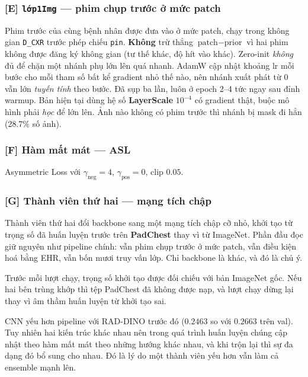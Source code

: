 \documentclass[11pt,a4paper]{article}
\newcommand{\code}[1]{\texttt{\small #1}}
\begin{document}
\subsubsection*{[E] \code{lớp1Img} --- phim chụp trước ở mức patch}

Phim trước của cùng bệnh nhân được đưa vào ở mức patch, chạy trong không gian
\code{D\_CXR} trước phép chiếu \code{pin}. \textbf{Không} trừ thẳng
$\text{patch} - \text{prior}$ vì hai phim không được đăng ký không gian (tư thế khác,
độ hít vào khác).
Zero-init \emph{không} đủ để chặn một nhánh phụ lớn lên quá
nhanh. AdamW cập nhật khoảng $\text{lr}$ mỗi bước cho mỗi tham số bất kể gradient nhỏ
thế nào, nên nhánh xuất phát từ 0 vẫn lớn \emph{tuyến tính} theo bước. Đã sụp ba lần,
luôn ở epoch 2--4 tức ngay sau đỉnh warmup. Bản hiện tại dùng hệ số \textbf{LayerScale}
$10^{-4}$ có gradient thật, buộc mô hình phải \emph{học} để lớn lên. Ảnh nào không có
phim trước thì nhánh bị mask đi hẳn (28.7\% số ảnh).

\subsubsection*{[F] Hàm mất mát --- ASL}

Asymmetric Loss với $\gamma_{\text{neg}} = 4$, $\gamma_{\text{pos}} = 0$, clip $0.05$.

\subsubsection*{[G] Thành viên thứ hai --- mạng tích chập}

Thành viên thứ hai đổi backbone sang một mạng tích chập cỡ nhỏ, khởi tạo từ trọng số đã
huấn luyện trước trên \textbf{PadChest} thay vì từ ImageNet. Phần đầu đọc giữ nguyên như
pipeline chính: vẫn phim chụp trước ở mức patch, vẫn điều kiện hoá bằng EHR, vẫn bốn mươi
truy vấn lớp. Chỉ backbone là khác, và đó là chủ ý.

Trước mỗi lượt chạy, trọng số khởi tạo được đối chiếu với bản ImageNet gốc. Nếu hai bên
trùng khớp thì tệp PadChest đã không được nạp, và lượt chạy dừng lại thay vì âm thầm huấn
luyện từ khởi tạo sai.

CNN yếu hơn pipeline với RAD-DINO trước đó ($0.2463$ so với $0.2663$ trên val). Tuy nhiên
hai kiến trúc khác nhau nên trong quá trình huấn luyện chúng cập nhật theo hàm mất mát
theo những hướng khác nhau, và khi trộn lại thì sự đa dạng đó bổ sung cho nhau. Đó là lý do một thành viên yếu hơn vẫn làm cả ensemble mạnh lên.
\end{document}
